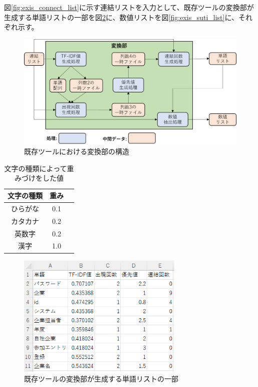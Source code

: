 図\ref{fig:exis_connect_list}に示す連結リストを入力として、既存ツールの変換部が生成する単語リストの一部を図\ref{fig:exis_word_list}に、数値リストを図\ref{fig:exis_suti_list}に、それぞれ示す。

\begin{figure}[tp]
    \begin{center}
        \includegraphics[width=1.0\columnwidth]{image/exis_transfer_structure.png}
        \caption{既存ツールにおける変換部の構造}
        \label{fig:exis_transfer_structure}
    \end{center}
\end{figure}

\begin{table}[tp]
    \begin{center}      
        \caption{文字の種類によって重みづけをした値}\label{table:yusenti}
        \begin{tabular}{c|c|c}
        文字の種類  & 重み \\ \hline \hline
        ひらがな & 0.1 \\ \hline
        カタカナ	 & 0.2\\ \hline
        英数字  & 0.2\\ \hline
        漢字 & 1.0\\ \hline
        \end{tabular}
    \end{center}
\end{table}

\begin{figure}[tp]
    \begin{center}
        \includegraphics[width=300]{image/exis_word_list.png}
        \caption{既存ツールの変換部が生成する単語リストの一部}
        \label{fig:exis_word_list}
    \end{center}
\end{figure}

